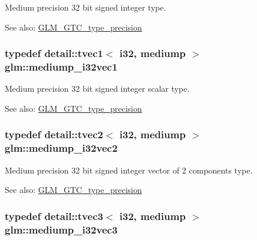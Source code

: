 Medium precision 32 bit signed integer type. \begin{Desc}
\item[See also:]\hyperlink{group__gtc__type__precision}{GLM\_\-GTC\_\-type\_\-precision} \end{Desc}
\hypertarget{group__gtc__type__precision_g44c6a3b78e635d91e35e1c41ab6b0ba1}{
\subsubsection[mediump\_\-i32vec1]{\setlength{\rightskip}{0pt plus 5cm}typedef detail::tvec1$<$ i32, mediump $>$ {\bf glm::mediump\_\-i32vec1}}}
\label{group__gtc__type__precision_g44c6a3b78e635d91e35e1c41ab6b0ba1}


Medium precision 32 bit signed integer scalar type. \begin{Desc}
\item[See also:]\hyperlink{group__gtc__type__precision}{GLM\_\-GTC\_\-type\_\-precision} \end{Desc}
\hypertarget{group__gtc__type__precision_gef7b37956ce9e1cc4faecf21b7fdae8b}{
\subsubsection[mediump\_\-i32vec2]{\setlength{\rightskip}{0pt plus 5cm}typedef detail::tvec2$<$ i32, mediump $>$ {\bf glm::mediump\_\-i32vec2}}}
\label{group__gtc__type__precision_gef7b37956ce9e1cc4faecf21b7fdae8b}


Medium precision 32 bit signed integer vector of 2 components type. \begin{Desc}
\item[See also:]\hyperlink{group__gtc__type__precision}{GLM\_\-GTC\_\-type\_\-precision} \end{Desc}
\hypertarget{group__gtc__type__precision_g768e62b66086bd85a438341eedfad651}{
\subsubsection[mediump\_\-i32vec3]{\setlength{\rightskip}{0pt plus 5cm}typedef detail::tvec3$<$ i32, mediump $>$ {\bf glm::mediump\_\-i32vec3}}}
\label{group__gtc__type__precision_g768e62b66086bd85a438341eedfad651}


